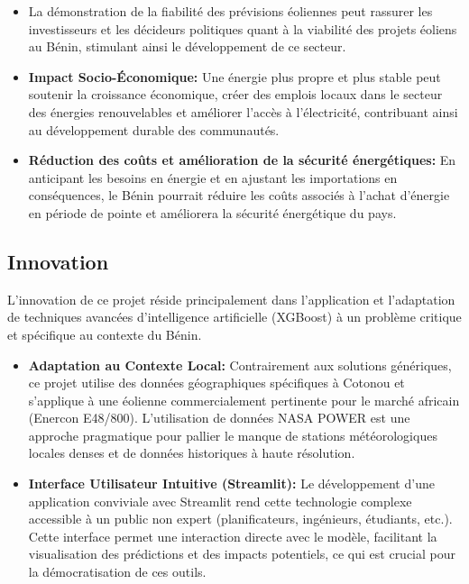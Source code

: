 \documentclass[12pt]{article}
\begin{document}
\begin{itemize}[label=$\color{blue}\bigstar$]
	\item \textbf{\color{blue}{Incitation à l'Investissement et à la Planification:}} La démonstration de la fiabilité des prévisions éoliennes peut rassurer les investisseurs et les décideurs politiques quant à la viabilité des projets éoliens au Bénin, stimulant ainsi le développement de ce secteur.
	\item \textbf{\color{blue}Impact Socio-Économique:} Une énergie plus propre et plus stable peut soutenir la croissance économique, créer des emplois locaux dans le secteur des énergies renouvelables et améliorer l'accès à l'électricité, contribuant ainsi au développement durable des communautés.
	\item \textbf{\color{blue}Réduction des coûts et amélioration de la sécurité énergétiques:} En anticipant les besoins en énergie et en ajustant les importations en conséquences, le Bénin pourrait réduire les coûts associés à l’achat d’énergie en période de pointe et améliorera la sécurité énergétique du pays.
\end{itemize}
\subsection{Innovation}
L'innovation de ce projet réside principalement dans l'application et l'adaptation de techniques avancées d'intelligence artificielle (XGBoost) à un problème critique et spécifique au contexte du Bénin.
\begin{itemize}[label=$\color{blue}\dagger$]
	\item \textbf{\color{blue}Adaptation au Contexte Local:} Contrairement aux solutions génériques, ce projet utilise des données géographiques spécifiques à Cotonou et s'applique à une éolienne commercialement pertinente pour le marché africain (Enercon E48/800). L'utilisation de données NASA POWER est une approche pragmatique pour pallier le manque de stations météorologiques locales denses et de données historiques à haute résolution.
	\item \textbf{\color{blue}Interface Utilisateur Intuitive (Streamlit):} Le développement d'une application conviviale avec Streamlit rend cette technologie complexe accessible à un public non expert (planificateurs, ingénieurs, étudiants, etc.). Cette interface permet une interaction directe avec le modèle, facilitant la visualisation des prédictions et des impacts potentiels, ce qui est crucial pour la démocratisation de ces outils.
\end{itemize}
\end{document}
